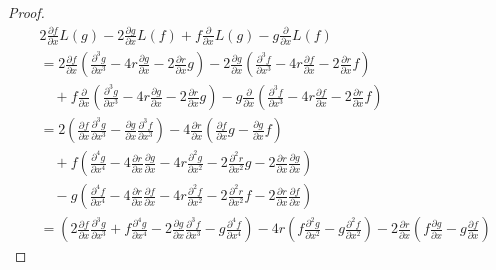 \documentclass[paper=a4, fontsize=11pt]{jlreq} %
\theoremstyle{break}
\theoremstyle{qa}
\begin{document}
\begin{proof}
\begin{align*}
    & 2 \frac{\partial f}{\partial x} L(g) - 2 \frac{\partial g}{\partial x} L(f) + f \frac{\partial}{\partial x} L(g) - g \frac{\partial}{\partial x} L(f) \\
    &= 2 \frac{\partial f}{\partial x} \left( \frac{\partial^3 g}{\partial x^3} - 4r \frac{\partial g}{\partial x} - 2 \frac{\partial r}{\partial x} g \right) - 2 \frac{\partial g}{\partial x} \left( \frac{\partial^3 f}{\partial x^3} - 4r \frac{\partial f}{\partial x} - 2 \frac{\partial r}{\partial x} f \right) \\
    &\quad + f \frac{\partial}{\partial x} \left( \frac{\partial^3 g}{\partial x^3} - 4r \frac{\partial g}{\partial x} - 2 \frac{\partial r}{\partial x} g \right) - g \frac{\partial}{\partial x} \left( \frac{\partial^3 f}{\partial x^3} - 4r \frac{\partial f}{\partial x} - 2 \frac{\partial r}{\partial x} f \right) \\
    &= 2 \left( \frac{\partial f}{\partial x}\frac{\partial^3 g}{\partial x^3} - \frac{\partial g}{\partial x}\frac{\partial^3 f}{\partial x^3} \right) - 4 \frac{\partial r}{\partial x} \left( \frac{\partial f}{\partial x}g - \frac{\partial g}{\partial x}f \right) \\
    &\quad + f \left( \frac{\partial^4 g}{\partial x^4} - 4 \frac{\partial r}{\partial x}\frac{\partial g}{\partial x} - 4r \frac{\partial^2 g}{\partial x^2} - 2 \frac{\partial^2 r}{\partial x^2}g - 2 \frac{\partial r}{\partial x}\frac{\partial g}{\partial x} \right) \\
    &\quad - g \left( \frac{\partial^4 f}{\partial x^4} - 4 \frac{\partial r}{\partial x}\frac{\partial f}{\partial x} - 4r \frac{\partial^2 f}{\partial x^2} - 2 \frac{\partial^2 r}{\partial x^2}f - 2 \frac{\partial r}{\partial x}\frac{\partial f}{\partial x} \right) \\
    &= \left( 2\frac{\partial f}{\partial x}\frac{\partial^3 g}{\partial x^3} + f\frac{\partial^4 g}{\partial x^4} - 2\frac{\partial g}{\partial x}\frac{\partial^3 f}{\partial x^3} - g\frac{\partial^4 f}{\partial x^4} \right) - 4r \left( f\frac{\partial^2 g}{\partial x^2} - g\frac{\partial^2 f}{\partial x^2} \right) - 2\frac{\partial r}{\partial x} \left( f\frac{\partial g}{\partial x} - g\frac{\partial f}{\partial x} \right)
\end{align*}


\end{proof}
\end{document}
